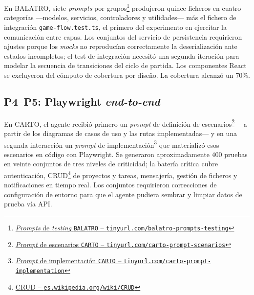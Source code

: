 En \ac{BALATRO}, siete \textit{prompts} por grupos\footnote{\href{https://github.com/alu0101549491/TFG-Fabian-Gonzalez-Lence/tree/main/resources/prompts/3-MiniBalatro/5-TestingPorGrupodeModulos}{\textit{Prompts} de \textit{testing} \texttt{BALATRO} -- \texttt{tinyurl.com/balatro-prompts-testing}}} produjeron quince ficheros en cuatro categorías ---modelos, servicios, controladores y utilidades--- más el fichero de integración \texttt{game-flow.test.ts}, el primero del experimento en ejercitar la comunicación entre capas. Los conjuntos del servicio de persistencia requirieron ajustes porque los \textit{mocks} no reproducían correctamente la deserialización ante estados incompletos; el test de integración necesitó una segunda iteración para modelar la secuencia de transiciones del ciclo de partida. Los componentes React se excluyeron del cómputo de cobertura por diseño. La cobertura alcanzó un 70\%.

\subsection{P4--P5: Playwright \textit{end-to-end}}

En \ac{CARTO}, el agente recibió primero un \textit{prompt} de definición de escenarios\footnote{\href{https://github.com/alu0101549491/TFG-Fabian-Gonzalez-Lence/blob/main/resources/prompts/4-CartographicProjectManager/5-TestingDeLaAplicacion/test-scenarios.prompt.md}{\textit{Prompt} de escenarios \texttt{CARTO} -- \texttt{tinyurl.com/carto-prompt-scenarios}}} ---a partir de los diagramas de casos de uso y las rutas implementadas--- y en una segunda interacción un \textit{prompt} de implementación\footnote{\href{https://github.com/alu0101549491/TFG-Fabian-Gonzalez-Lence/blob/main/resources/prompts/4-CartographicProjectManager/5-TestingDeLaAplicacion/test-implementations.prompt.md}{\textit{Prompt} de implementación \texttt{CARTO} -- \texttt{tinyurl.com/carto-prompt-implementation}}} que materializó esos escenarios en código con Playwright. Se generaron aproximadamente 400 pruebas en veinte conjuntos de tres niveles de criticidad; la batería crítica cubre autenticación, CRUD\footnote{\href{https://es.wikipedia.org/wiki/CRUD}{CRUD -- \texttt{es.wikipedia.org/wiki/CRUD}}} de proyectos y tareas, mensajería, gestión de ficheros y notificaciones en tiempo real. Los conjuntos requirieron correcciones de configuración de entorno para que el agente pudiera sembrar y limpiar datos de prueba vía \ac{API}.

